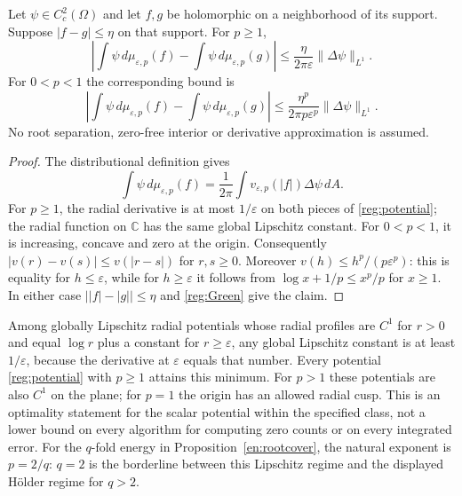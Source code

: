 \begin{theorem}\label{reg:field}
Let $\psi\in C_c^2(\Omega)$ and let $f,g$ be holomorphic on a neighborhood
of its support. Suppose $|f-g|\le\eta$ on that support. For $p\ge1$,
\begin{equation}\label{reg:Lip}
 \left|\int\psi\,d\mu_{\varepsilon,p}(f)
              -\int\psi\,d\mu_{\varepsilon,p}(g)\right|
 \le\frac{\eta}{2\pi\varepsilon}\|\Delta\psi\|_{L^1}.
\end{equation}
For $0<p<1$ the corresponding bound is
\begin{equation}\label{reg:Holder}
 \left|\int\psi\,d\mu_{\varepsilon,p}(f)
              -\int\psi\,d\mu_{\varepsilon,p}(g)\right|
 \le\frac{\eta^p}{2\pi p\varepsilon^p}\|\Delta\psi\|_{L^1}.
\end{equation}
No root separation, zero-free interior or derivative approximation is
assumed.
\end{theorem}
\begin{proof}
The distributional definition gives
\begin{equation}\label{reg:Green}
 \int\psi\,d\mu_{\varepsilon,p}(f)
 =\frac1{2\pi}\int v_{\varepsilon,p}(|f|)\Delta\psi\,dA.
\end{equation}
For $p\ge1$, the radial derivative is at most $1/\varepsilon$ on both
pieces of \eqref{reg:potential}; the radial function on $\mathbb C$ has
the same global Lipschitz constant. For $0<p<1$, it is increasing,
concave and zero at the origin. Consequently
$|v(r)-v(s)|\le v(|r-s|)$ for $r,s\ge0$. Moreover
$v(h)\le h^p/(p\varepsilon^p)$: this is equality for $h\le\varepsilon$,
while for $h\ge\varepsilon$ it follows from
$\log x+1/p\le x^p/p$ for $x\ge1$.
In either case $\big||f|-|g|\big|\le\eta$ and
\eqref{reg:Green} give the claim.
\end{proof}

\begin{remark}\label{reg:optimal}
Among globally Lipschitz radial potentials whose radial profiles are $C^1$ for $r>0$ and equal $\log r$ plus a constant for
$r\ge\varepsilon$, any global Lipschitz constant is at least
$1/\varepsilon$, because the derivative at $\varepsilon$ equals that
number. Every potential \eqref{reg:potential} with $p\ge1$ attains this
minimum. For $p>1$ these potentials are also $C^1$ on the plane; for $p=1$ the origin has an allowed radial cusp. This is an optimality statement for the scalar potential within
the specified class, not a lower bound on every algorithm for computing
zero counts or on every integrated error. For the $q$-fold energy in
Proposition~\ref{en:rootcover}, the natural exponent is $p=2/q$:
$q=2$ is the borderline between this Lipschitz regime and the displayed
H\"older regime for $q>2$.
\end{remark}

